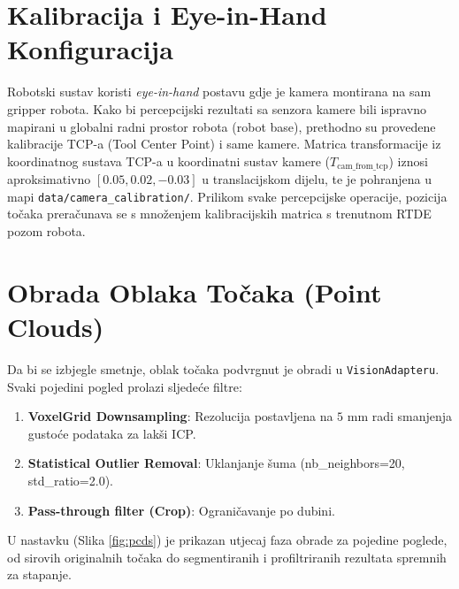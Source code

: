 \documentclass[12pt,a4paper]{article}
\begin{document}
\section{Kalibracija i Eye-in-Hand Konfiguracija}
Robotski sustav koristi \textit{eye-in-hand} postavu gdje je kamera montirana na sam gripper robota. 
Kako bi percepcijski rezultati sa senzora kamere bili ispravno mapirani u globalni radni prostor robota (robot base), prethodno su provedene kalibracije TCP-a (Tool Center Point) i same kamere. Matrica transformacije iz koordinatnog sustava TCP-a u koordinatni sustav kamere (\(T_{\text{cam\_from\_tcp}}\)) iznosi aproksimativno \([0.05, 0.02, -0.03]\) u translacijskom dijelu, te je pohranjena u mapi \texttt{data/camera\_calibration/}. Prilikom svake percepcijske operacije, pozicija točaka preračunava se s množenjem kalibracijskih matrica s trenutnom RTDE pozom robota.

\section{Obrada Oblaka Točaka (Point Clouds)}
Da bi se izbjegle smetnje, oblak točaka podvrgnut je obradi u \texttt{VisionAdapteru}. Svaki pojedini pogled prolazi sljedeće filtre:
\begin{enumerate}
    \item \textbf{VoxelGrid Downsampling}: Rezolucija postavljena na $5\text{ mm}$ radi smanjenja gustoće podataka za lakši ICP.
    \item \textbf{Statistical Outlier Removal}: Uklanjanje šuma (nb\_neighbors=20, std\_ratio=2.0).
    \item \textbf{Pass-through filter (Crop)}: Ograničavanje po dubini.
\end{enumerate}

U nastavku (Slika \ref{fig:pcds}) je prikazan utjecaj faza obrade za pojedine poglede, od sirovih originalnih točaka do segmentiranih i profiltriranih rezultata spremnih za stapanje.
\end{document}
